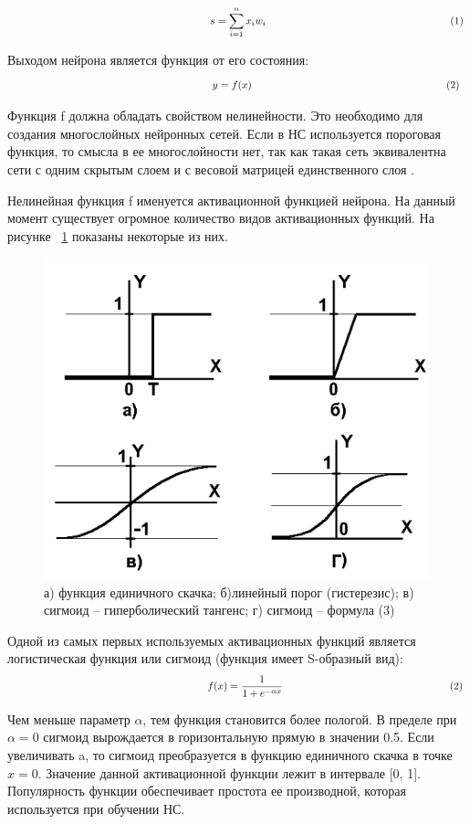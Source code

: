 \documentclass[a4paper,english,russian]{G2-105}
\begin{document}
\[
\ \hspace*{66mm} s = \sum_{i=1}^n x_i w_i \hspace*{62mm} (1)
\] 
\par Выходом нейрона является функция от его состояния:
\[
\ \hspace*{66mm} y = f(x) \hspace*{66mm} (2)
\] 
\par Функция f должна обладать свойством нелинейности. Это необходимо для создания многослойных нейронных сетей. Если в НС используется пороговая функция, то смысла в ее многослойности нет, так как такая сеть эквивалентна сети с одним скрытым слоем и с весовой матрицей единственного слоя \cite{11}. 
\par Нелинейная функция f именуется активационной функцией нейрона. На данный момент существует огромное количество видов активационных функций. На рисунке ~\ref{activation_func} показаны некоторые из них.
\begin{figure}
    \includegraphics[width=0.6\linewidth]{activation_func.png}
    \caption{а) функция единичного скачка; б)линейный порог (гистерезис); в) сигмоид – гиперболический тангенс; г) сигмоид – формула (3)}
	\label{activation_func}
\end{figure}
\par Одной из самых первых используемых активационных функций является логистическая функция или сигмоид (функция имеет S-образный вид): 
\[
\ \hspace*{66mm} f(x) = \frac{1}{1 + e^{- \alpha x}}\ \hspace*{56mm} (2)
\] 
\par Чем меньше параметр $\alpha$, тем функция становится более пологой. В пределе при $\alpha=0$ сигмоид вырождается в горизонтальную прямую в значении 0.5. Если увеличивать a, то сигмоид преобразуется в функцию единичного скачка в точке $x=0$. Значение данной активационной функции лежит в интервале [0, 1]. Популярность функции обеспечивает простота ее производной, которая используется при обучении НС. 
\end{document}
